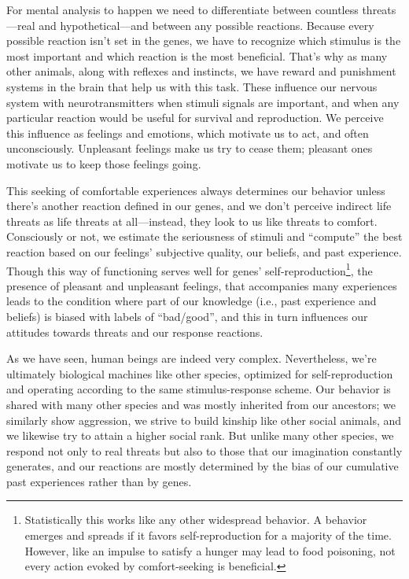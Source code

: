 \documentclass[12pt]{report}
\begin{document}
\noindent For mental analysis to happen we need to differentiate between countless threats\thinspace---\thinspace real and hypothetical\thinspace---\thinspace and between any possible reactions. Because every possible reaction isn’t set in the genes, we have to recognize which stimulus is the most important and which reaction is the most beneficial. That’s why as many other animals, along with reflexes and instincts, we have reward and punishment systems in the brain that help us with this task. These influence our nervous system with neurotransmitters when stimuli signals are important, and when any particular reaction would be useful for survival and reproduction. We perceive this influence as feelings and emotions, which motivate us to act, and often unconsciously. Unpleasant feelings make us try to cease them; pleasant ones motivate us to keep those feelings going.

\noindent This seeking of comfortable experiences always determines our behavior unless there’s another reaction defined in our genes, and we don’t perceive indirect life threats as life threats at all\thinspace---\thinspace instead, they look to us like threats to comfort. Consciously or not, we estimate the seriousness of stimuli and ``compute'' the best reaction based on our feelings’ subjective quality, our beliefs, and past experience. Though this way of functioning serves well for genes’ self-reproduction\footnote{Statistically this works like any other widespread behavior. A behavior emerges and spreads if it favors self-reproduction for a majority of the time. However, like an impulse to satisfy a hunger may lead to food poisoning, not every action evoked by comfort-seeking is beneficial.}, the presence of pleasant and unpleasant feelings, that accompanies many experiences leads to the condition where part of our knowledge (i.e., past experience and beliefs) is biased with labels of ``bad/good'', and this in turn influences our attitudes towards threats and our response reactions.

\noindent As we have seen, human beings are indeed very complex. Nevertheless, we’re ultimately biological machines like other species, optimized for self-reproduction and operating according to the same stimulus-response scheme. Our behavior is shared with many other species and was mostly inherited from our ancestors; we similarly show aggression, we strive to build kinship like other social animals, and we likewise try to attain a higher social rank. But unlike many other species, we respond not only to real threats but also to those that our imagination constantly generates, and our reactions are mostly determined by the bias of our cumulative past experiences rather than by genes.
\end{document}
